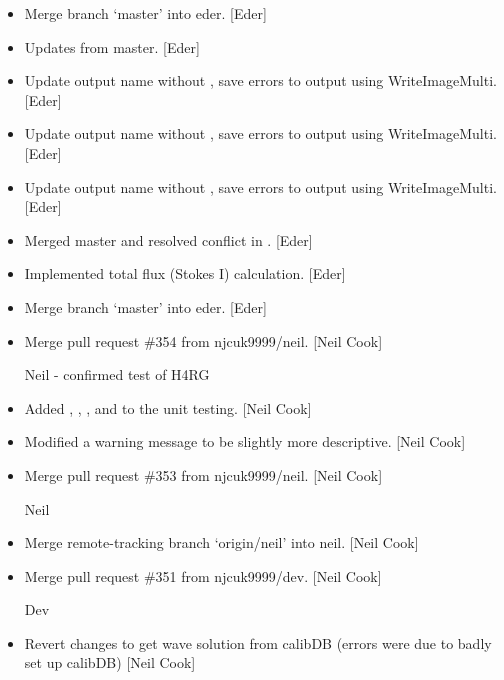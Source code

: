 \documentclass[a4paper,10pt,english]{report}
\begin{document}
\begin{itemize}
\item {} 
Merge branch ‘master’ into eder. {[}Eder{]}

\item {} 
Updates from master. {[}Eder{]}

\item {} 
Update output name without , save errors to output using
WriteImageMulti. {[}Eder{]}

\item {} 
Update output name without , save errors to output using
WriteImageMulti. {[}Eder{]}

\item {} 
Update output name without , save errors to output using
WriteImageMulti. {[}Eder{]}

\item {} 
Merged master and resolved conflict in . {[}Eder{]}

\item {} 
Implemented total flux (Stokes I) calculation. {[}Eder{]}

\item {} 
Merge branch ‘master’ into eder. {[}Eder{]}

\item {} 
Merge pull request \#354 from njcuk9999/neil. {[}Neil Cook{]}

Neil - confirmed test of H4RG

\item {} 
Added , , ,  and 
to the unit testing. {[}Neil Cook{]}

\item {} 
Modified a warning message to be slightly more descriptive. {[}Neil
Cook{]}

\item {} 
Merge pull request \#353 from njcuk9999/neil. {[}Neil Cook{]}

Neil

\item {} 
Merge remote-tracking branch ‘origin/neil’ into neil. {[}Neil Cook{]}

\item {} 
Merge pull request \#351 from njcuk9999/dev. {[}Neil Cook{]}

Dev

\item {} 
Revert changes to get wave solution from calibDB (errors were due to
badly set up calibDB) {[}Neil Cook{]}


\end{itemize}
\end{document}
